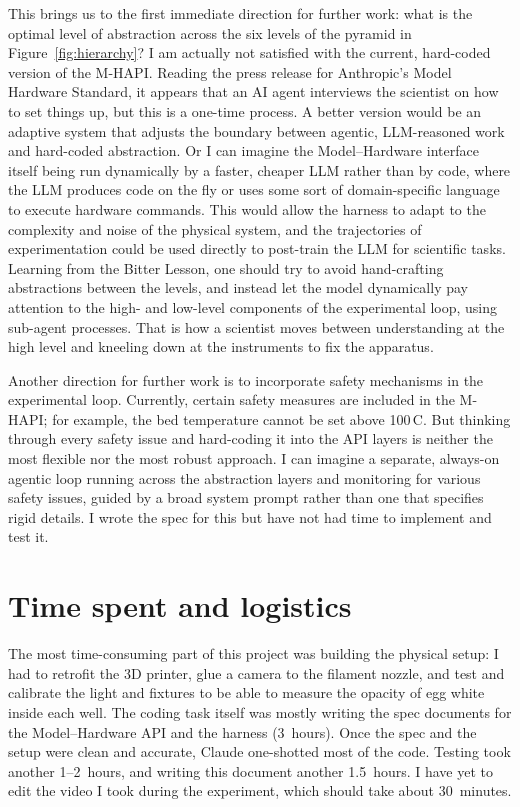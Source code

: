 \documentclass[11pt,letterpaper]{article}
\newcommand{\mhapi}{M-HAPI}
\begin{document}
This brings us to the first immediate direction for further work: what is the optimal level of
abstraction across the six levels of the pyramid in Figure~\ref{fig:hierarchy}? I am actually not
satisfied with the current, hard-coded version of the \mhapi. Reading the press release for Anthropic's Model Hardware Standard, it appears that an AI agent interviews the scientist on how to set things up, but this is a
one-time process. A better version would be an adaptive system that adjusts the boundary between
agentic, LLM-reasoned work and hard-coded abstraction. Or I can imagine the Model--Hardware
interface itself being run dynamically by a faster, cheaper LLM rather than by code, where the LLM
produces code on the fly or uses some sort of domain-specific language to execute hardware
commands. This would allow the harness to adapt to the complexity and noise of the physical
system, and the trajectories of experimentation could be used directly to post-train the LLM for
scientific tasks. Learning from the Bitter Lesson, one should try to avoid hand-crafting
abstractions between the levels, and instead let the model dynamically pay attention to the high-
and low-level components of the experimental loop, using sub-agent processes. That is how a
scientist moves between understanding at the high level and kneeling down at the instruments to
fix the apparatus.

Another direction for further work is to incorporate safety mechanisms in the experimental loop. Currently, certain safety measures are included in the \mhapi; for example, the bed temperature cannot
be set above 100\,\textdegree C. But thinking through every safety issue and hard-coding it into
the API layers is neither the most flexible nor the most robust approach. I can imagine a
separate, always-on agentic loop running across the abstraction layers and monitoring for various
safety issues, guided by a broad system prompt rather than one that specifies rigid details. I
wrote the spec for this but have not had time to implement and test it.

\section{Time spent and logistics}

The most time-consuming part of this project was building the physical setup: I had to retrofit
the 3D printer, glue a camera to the filament nozzle, and test and calibrate the light and fixtures
to be able to measure the opacity of egg white inside each well. The coding task itself was mostly
writing the spec documents for the Model--Hardware API and the harness (3~hours). Once the spec and
the setup were clean and accurate, Claude one-shotted most of the code. Testing took another
1--2~hours, and writing this document another 1.5~hours. I have yet to edit the video I took during
the experiment, which should take about 30~minutes.
\end{document}
